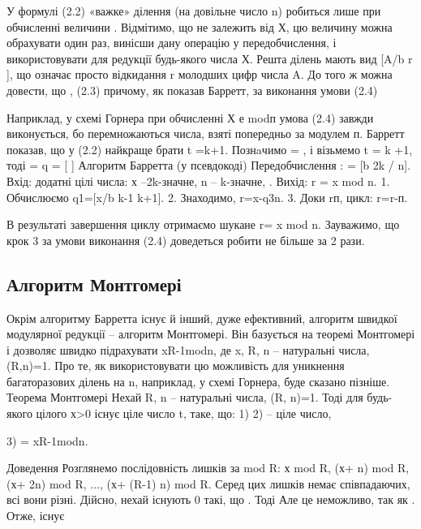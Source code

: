 У формулі (2.2) «важке» ділення (на довільне число n) робиться лише при
обчисленні величини . Відмітимо, що не залежить від Х, цю
величину можна обрахувати один раз, винісши дану операцію у
передобчислення, і використовувати для редукції будь-якого числа Х. Решта
ділень мають вид [A/b r ], що означає просто відкидання r молодших цифр числа
A. До того ж можна довести, що
, (2.3)
причому, як показав Барретт, за виконання умови
(2.4)





Наприклад, у схемі Горнера при обчисленні Х е modп умова (2.4) завжди
виконується, бо перемножаються числа, взяті попередньо за модулем п.
Барретт показав, що у (2.2) найкраще брати t =k+1.
Познaчимо  = , і візьмемо t = k +1,
тоді = q = [  ]
Алгоритм Барретта (у псевдокоді)
Передобчислення : = [b
2k
/ n].
Вхід: додатні цілі числа: х –2k-значне, n – k-значне, .
Вихід: r = x mod n.
1. Обчислюємо q1=[x/b
k-1
k+1].
2. Знаходимо, r=x-q3n.
3. Доки rп, цикл: r=r-п.

В результаті завершення циклу отримаємо шукане r= x mod n.
Зауважимо, що крок 3 за умови виконання (2.4) доведеться робити не більше за
2 рази.

\subsection{Алгоритм Монтгомері}

Окрім алгоритму Барретта існує й інший, дуже ефективний, алгоритм
швидкої модулярної редукції – алгоритм Монтгомері. Він базується на теоремі
Монтгомері і дозволяє швидко підрахувати xR-1modn, де x, R, n – натуральні
числа, (R,n)=1. Про те, як використовувати цю можливість для уникнення
багаторазових ділень на n, наприклад, у схемі Горнера, буде сказано пізніше.
Теорема Монтгомері
Нехай R, n – натуральні числа, (R, n)=1.
Тоді для будь-якого цілого х>0 існує ціле число t, таке, що:
1) 
2) – ціле число,

3) = xR-1modn.
 
Доведення
Розглянемо послідовність лишків за mod R:
х mod R, (х+ n) mod R, (х+ 2n) mod R, ..., (х+ (R-1) n) mod R.
Серед цих лишків немає співпадаючих, всі вони різні.
Дійсно, нехай існують 0  такі, що . Тоді
Але це неможливо, так як . Отже, існує

